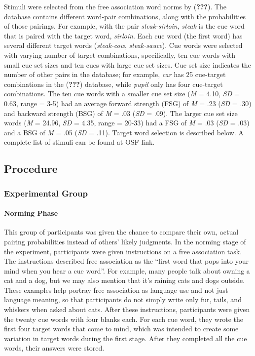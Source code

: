\documentclass[english,man]{apa6}
\theoremstyle{definition}
\theoremstyle{definition}
\theoremstyle{definition}
\theoremstyle{remark}
\begin{document}
Stimuli were selected from the free association word norms by
({\textbf{???}}). The database contains different word-pair
combinations, along with the probabilities of those pairings. For
example, with the pair \emph{steak-sirloin}, \emph{steak} is the cue
word that is paired with the target word, \emph{sirloin}. Each cue word
(the first word) has several different target words (\emph{steak-cow},
\emph{steak-sauce}). Cue words were selected with varying number of
target combinations, specifically, ten cue words with small cue set
sizes and ten cues with large cue set sizes. Cue set size indicates the
number of other pairs in the database; for example, \emph{car} has 25
cue-target combinations in the ({\textbf{???}}) database, while
\emph{pupil} only has four cue-target combinations. The ten cue words
with a smaller cue set size (\emph{M} = 4.10, \emph{SD} = 0.63, range =
3-5) had an average forward strength (FSG) of \emph{M} = .23 (\emph{SD}
= .30) and backward strength (BSG) of \emph{M} = .03 (\emph{SD} = .09).
The larger cue set size words (\emph{M} = 24.96, \emph{SD} = 4.35, range
= 20-33) had a FSG of \emph{M} = .03 (\emph{SD} = .03) and a BSG of
\emph{M} = .05 (\emph{SD} = .11). Target word selection is described
below. A complete list of stimuli can be found at OSF link.

\subsection{Procedure}\label{procedure}

\subsubsection{Experimental Group}\label{experimental-group}

\paragraph{Norming Phase}\label{norming-phase}

This group of participants was given the chance to compare their own,
actual pairing probabilities instead of others' likely judgments. In the
norming stage of the experiment, participants were given instructions on
a free association task. The instructions described free association as
the \enquote{first word that pops into your mind when you hear a cue
word}. For example, many people talk about owning a cat and a dog, but
we may also mention that it's raining cats and dogs outside. These
examples help portray free association as language use and not just
language meaning, so that participants do not simply write only fur,
tails, and whiskers when asked about cats. After these instructions,
participants were given the twenty cue words with four blanks each. For
each cue word, they wrote the first four target words that come to mind,
which was intended to create some variation in target words during the
first stage. After they completed all the cue words, their answers were
stored.
\end{document}
